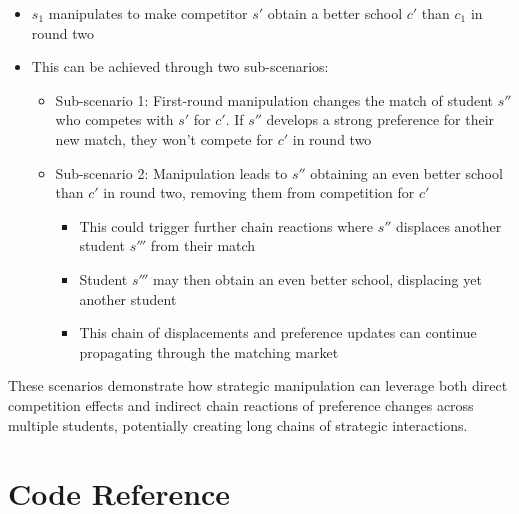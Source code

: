 \documentclass{article}
\begin{document}
\begin{itemize}
    \item $s_1$ manipulates to make competitor $s'$ obtain a better school $c'$ than $c_1$ in round two
    \item This can be achieved through two sub-scenarios:
    \begin{itemize}
        \item Sub-scenario 1: First-round manipulation changes the match of student $s''$ who competes with $s'$ for $c'$. If $s''$ develops a strong preference for their new match, they won't compete for $c'$ in round two
        \item Sub-scenario 2: Manipulation leads to $s''$ obtaining an even better school than $c'$ in round two, removing them from competition for $c'$
        \begin{itemize}
            \item This could trigger further chain reactions where $s''$ displaces another student $s'''$ from their match
            \item Student $s'''$ may then obtain an even better school, displacing yet another student
            \item This chain of displacements and preference updates can continue propagating through the matching market
        \end{itemize}
    \end{itemize}
\end{itemize}
These scenarios demonstrate how strategic manipulation can leverage both direct competition effects and indirect chain reactions of preference changes across multiple students, potentially creating long chains of strategic interactions.

\newpage

\appendix
\section{Code Reference}
\end{document}
